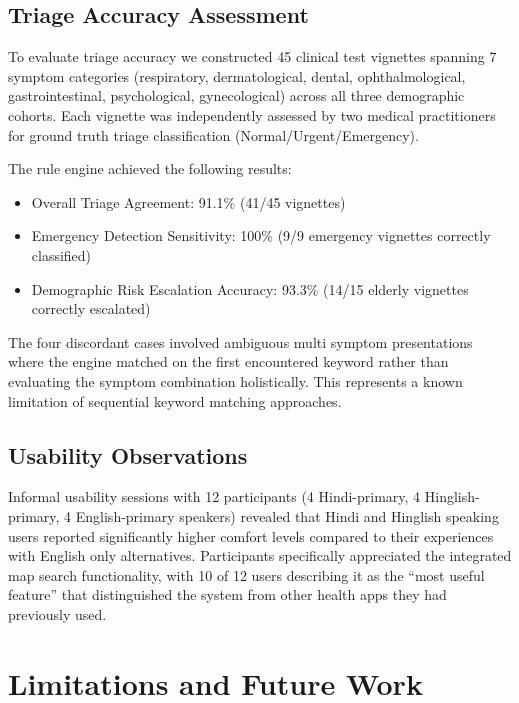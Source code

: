 \documentclass[conference]{IEEEtran}
\begin{document}
\subsection{Triage Accuracy Assessment}

To evaluate triage accuracy we constructed 45 clinical test vignettes spanning 7 symptom categories (respiratory, dermatological, dental, ophthalmological, gastrointestinal, psychological, gynecological) across all three demographic cohorts. Each vignette was independently assessed by two medical practitioners for ground truth triage classification (Normal/Urgent/Emergency).

The rule engine achieved the following results:

\begin{itemize}
\item Overall Triage Agreement: 91.1\% (41/45 vignettes)
\item Emergency Detection Sensitivity: 100\% (9/9 emergency vignettes correctly classified)
\item Demographic Risk Escalation Accuracy: 93.3\% (14/15 elderly vignettes correctly escalated)
\end{itemize}

The four discordant cases involved ambiguous multi symptom presentations where the engine matched on the first encountered keyword rather than evaluating the symptom combination holistically. This represents a known limitation of sequential keyword matching approaches.

\subsection{Usability Observations}

Informal usability sessions with 12 participants (4 Hindi-primary, 4 Hinglish-primary, 4 English-primary speakers) revealed that Hindi and Hinglish speaking users reported significantly higher comfort levels compared to their experiences with English only alternatives. Participants specifically appreciated the integrated map search functionality, with 10 of 12 users describing it as the ``most useful feature'' that distinguished the system from other health apps they had previously used.

\section{Limitations and Future Work}
\end{document}
